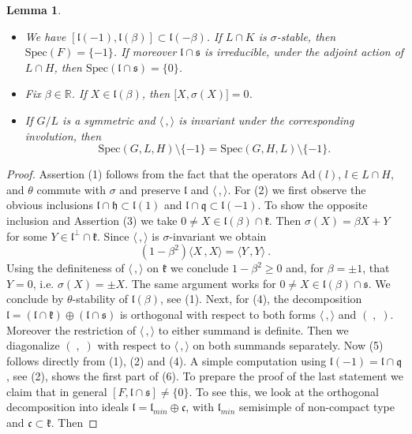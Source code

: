 \documentclass[10]{amsart}
\newtheorem{lem}[thm]{Lemma}
\theoremstyle{remark}
\theoremstyle{definition}
\numberwithin{equation}{section}
\newcommand{\Ad}{\text{Ad}}
\newcommand{\fc}{{\mathfrak c}}
\newcommand{\fh}{{\mathfrak h}}
\newcommand{\fk}{{\mathfrak k}}
\newcommand{\fl}{{\mathfrak l}}
\newcommand{\fq}{{\mathfrak q}}
\newcommand{\fs}{{\mathfrak s}}
\newcommand{\IP}[2]{\langle#1\,, #2\rangle}     %
\begin{document}
{\begin{lem}
\begin{itemize}
\begin{eqnarray*}
\fl\cap\fs&=&\bigoplus_{\beta\ne 1} (\fl(\beta)\cap\fs)
\end{eqnarray*}
%
Define $\text{Spec}(F):=\{\beta\in{\mathbb R\setminus\{1\}}\mid \fl(\beta)\cap \fk\neq\{0\}\}$, $\text{Spec}(\fl\cap\fs):=\{\beta\in{\mathbb R}\mid \fl(\beta)\cap\fs\neq\{0\}\}\subset [-1,1)$ and 
$\text{Spec}(G,H,L):=\text{Spec}(F)\cup \text{Spec}(\fl\cap\fs)$.
\item[(6)] We have $[\fl(-1),\fl(\beta)]\subset \fl(-\beta)$. If $L\cap K$ is $\sigma$-stable, then $\text{Spec}(F)=\{-1\}$. If moreover $\fl\cap\fs$ is irreducible, under the adjoint action of $L\cap H$, then $\text{Spec}(\fl\cap\fs)=\{0\}$.
\item[(7)] Fix $\beta\in\mathbb{R}$. If $X\in \fl(\beta)$, then $\lbrack X,\sigma(X)\rbrack=0$.
\item[(8)] If $G/L$ is a symmetric and $\IP{}{}$ is invariant under the corresponding involution, then 
$$\text{Spec}(G,L,H)\setminus\{-1\}=\text{Spec}(G,H,L)\setminus\{-1\}. $$
\end{itemize}
\end{lem}
%
\begin{proof}
Assertion (1) follows from the fact that the operators $\Ad(l)$, $l\in L\cap H$, and $\theta$ commute with $\sigma$ and preserve $\fl$ and $\IP{}{}$.
For (2) we first observe the obvious inclusions $\fl\cap\fh\subset\fl(1)$ and $\fl\cap\fq\subset\fl(-1)$. To show the opposite inclusion and Assertion (3) we take $0\ne X\in\fl(\beta)\cap\fk$.
Then $\sigma(X)=\beta X+Y$ for some $Y\in\fl^\perp\cap\fk$. Since $\IP{}{}$ is $\sigma$-invariant we obtain
$$ (1-\beta^2)\IP{X}{X}=\IP{Y}{Y}\ .$$
Using the definiteness of $\IP{}{}$ on $\fk$ we conclude $1-\beta^2\ge 0$ and, for $\beta=\pm 1$, that $Y=0$, i.e. $\sigma(X)=\pm X$. The same argument
works for $0\ne X\in\fl(\beta)\cap\fs$. We conclude by $\theta$-stability of $\fl(\beta)$, see (1).
Next, for (4), the decomposition $\fl=(\fl\cap \fk)\oplus(\fl\cap\fs)$ is orthogonal with respect to both forms $\IP{}{}$ and $(\;,\;)$. Moreover the restriction of $\IP{}{}$ to either summand is definite. Then we diagonalize $(\;,\;)$ with respect to $\IP{}{}$ 
on both summands separately. Now (5) follows directly from (1), (2) and (4). 
A simple computation using $\fl(-1)=\fl\cap\fq$, see (2), shows the first part of (6).
To prepare the proof of the last statement we claim that in general 
$[F,\fl\cap \fs]\ne\{0\}$. To see this, we look at the
orthogonal decomposition into ideals $\fl=\fl_{min}\oplus \fc$, with $\fl_{min}$ semisimple of non-compact type and $\fc\subset\fk$. Then

\end{proof}}
\end{document}
